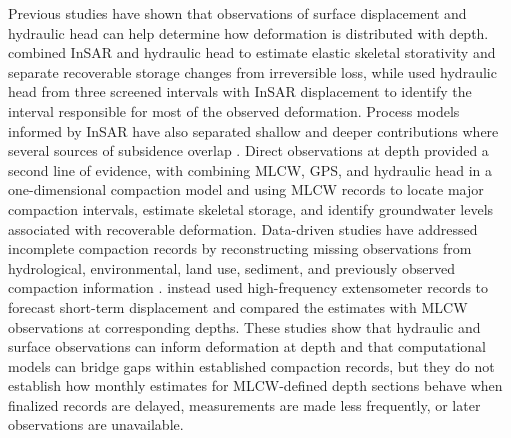 Previous studies have shown that observations of surface displacement and hydraulic head can help determine how deformation is distributed with depth. \citet{jiang2018_insar} combined InSAR and hydraulic head to estimate elastic skeletal storativity and separate recoverable storage changes from irreversible loss, while \citet{smith2021_depth} used hydraulic head from three screened intervals with InSAR displacement to identify the interval responsible for most of the observed deformation. Process models informed by InSAR have also separated shallow and deeper contributions where several sources of subsidence overlap \citep{verberne2025_ravenna,verberne2025_dutch}. Direct observations at depth provided a second line of evidence, with \citet{hung2012_mlcw} combining MLCW, GPS, and hydraulic head in a one-dimensional compaction model and \citet{hung_measuring_2021} using MLCW records to locate major compaction intervals, estimate skeletal storage, and identify groundwater levels associated with recoverable deformation. Data-driven studies have addressed incomplete compaction records by reconstructing missing observations from hydrological, environmental, land use, sediment, and previously observed compaction information \citep{liu_reconstructing_2023,liu_deep_2025}. \citet{hung2025_realtime} instead used high-frequency extensometer records to forecast short-term displacement and compared the estimates with MLCW observations at corresponding depths. These studies show that hydraulic and surface observations can inform deformation at depth and that computational models can bridge gaps within established compaction records, but they do not establish how monthly estimates for MLCW-defined depth sections behave when finalized records are delayed, measurements are made less frequently, or later observations are unavailable.
